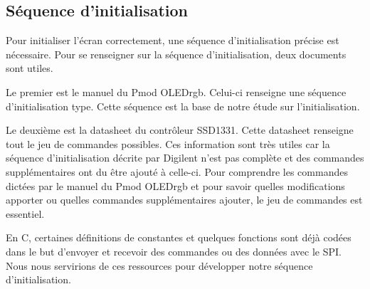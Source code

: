 \documentclass[11pt]{article}
\begin{document}
\subsection{Séquence d'initialisation}

Pour initialiser l'écran correctement, une séquence d'initialisation précise est nécessaire. Pour se renseigner sur la séquence d'initialisation, deux documents sont utiles. 

Le premier est le manuel du Pmod OLEDrgb\cite{oledrgb}. Celui-ci renseigne une séquence d'initialisation type. Cette séquence est la base de notre étude sur l'initialisation. 

Le deuxième est la datasheet du contrôleur SSD1331\cite{ssd1331}. Cette datasheet renseigne tout le jeu de commandes possibles. Ces information sont très utiles car la séquence d'initialisation décrite par Digilent n'est pas complète et des commandes supplémentaires ont du être ajouté à celle-ci. Pour comprendre les commandes dictées par le manuel du Pmod OLEDrgb et pour savoir quelles modifications apporter ou quelles commandes supplémentaires ajouter, le jeu de commandes est essentiel. 

En C, certaines définitions de constantes et quelques fonctions sont déjà codées dans le but d'envoyer et recevoir des commandes ou des données avec le SPI. Nous nous servirions de ces ressources pour développer notre séquence d'initialisation. 
\end{document}
